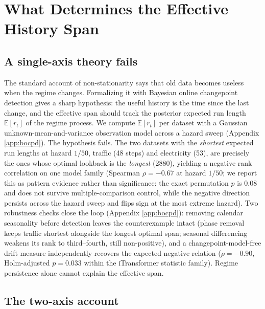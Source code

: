 \section{What Determines the Effective History Span}
\label{sec:why}

\subsection{A single-axis theory fails}
\label{sec:bocpd}

The standard account of non-stationarity says that old data becomes useless when the regime changes. Formalizing it with Bayesian online changepoint detection \citep{bocpd} gives a sharp hypothesis: the useful history is the time since the last change, and the effective span should track the posterior expected run length $\mathbb{E}[r_t]$ of the regime process. We compute $\mathbb{E}[r_t]$ per dataset with a Gaussian unknown-mean-and-variance observation model across a hazard sweep (Appendix \ref{app:bocpd}). The hypothesis fails. The two datasets with the \emph{shortest} expected run lengths at hazard $1/50$, traffic (48 steps) and electricity (53), are precisely the ones whose optimal lookback is the \emph{longest} (2880), yielding a negative rank correlation on one model family (Spearman $\rho = -0.67$ at hazard $1/50$; we report this as pattern evidence rather than significance: the exact permutation $p$ is 0.08 and does not survive multiple-comparison control, while the negative direction persists across the hazard sweep and flips sign at the most extreme hazard). Two robustness checks close the loop (Appendix \ref{app:bocpd}): removing calendar seasonality before detection leaves the counterexample intact (phase removal keeps traffic shortest alongside the longest optimal span; seasonal differencing weakens its rank to third--fourth, still non-positive), and a changepoint-model-free drift measure independently recovers the expected negative relation ($\rho = -0.90$, Holm-adjusted $p = 0.033$ within the iTransformer statistic family). Regime persistence alone cannot explain the effective span.

\subsection{The two-axis account}

